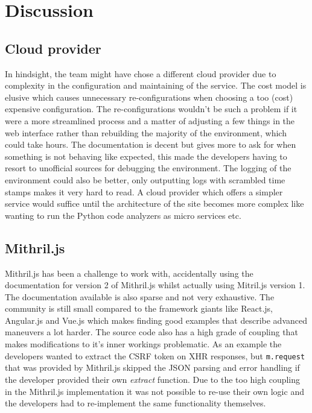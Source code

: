 \documentclass[12pt,a4paper]{report}
\begin{document}
\chapter{Discussion}

\section{Cloud provider}
In hindsight, the team might have chose a different cloud provider due to complexity in the configuration and maintaining of the service. The cost model is elusive which causes unnecessary re-configurations when choosing a too (cost) expensive configuration. The re-configurations wouldn't be such a problem if it were a more streamlined process and a matter of adjusting a few things in the web interface rather than rebuilding the majority of the environment, which could take hours. The documentation is decent but gives more to ask for when something is not behaving like expected, this made the developers having to resort to unofficial sources for debugging the environment. The logging of the environment could also be better, only outputting logs with scrambled time stamps makes it very hard to read. A cloud provider which offers a simpler service would suffice until the architecture of the site becomes more complex like wanting to run the Python code analyzers as micro services etc.

\section{Mithril.js}
Mithril.js has been a challenge to work with, accidentally using the documentation for version 2 of Mithril.js whilst actually using Mitril.js version 1. The documentation available is also sparse and not very exhaustive. The community is still small compared to the framework giants like React.js, Angular.js and Vue.js which makes finding good examples that describe advanced maneuvers a lot harder. The source code also has a high grade of coupling that makes modifications to it's inner workings problematic. As an example the developers wanted to extract the CSRF token on XHR responses, but \texttt{m.request} that was provided by Mithril.js skipped the JSON parsing and error handling if the developer provided their own \textit{extract} function. Due to the too high coupling in the Mithril.js implementation it was not possible to re-use their own logic and the developers had to re-implement the same functionality themselves.
\end{document}
